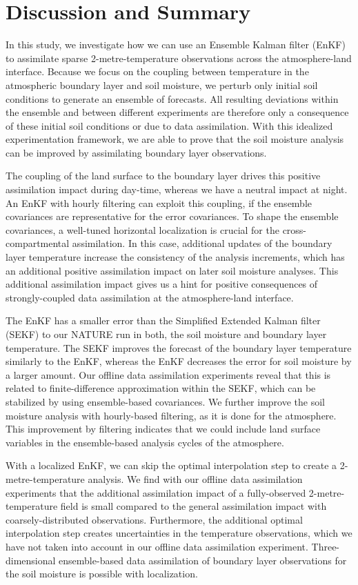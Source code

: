 \documentclass[hess, manuscript]{copernicus}
\begin{document}
\section{Discussion and Summary}

In this study, we investigate how we can use an Ensemble Kalman filter (EnKF) to assimilate sparse 2-metre-temperature observations across the atmosphere-land interface.
Because we focus on the coupling between temperature in the atmospheric boundary layer and soil moisture, we perturb only initial soil conditions to generate an ensemble of forecasts.
All resulting deviations within the ensemble and between different experiments are therefore only a consequence of these initial soil conditions or due to data assimilation.
With this idealized experimentation framework, we are able to prove that
the soil moisture analysis can be improved by assimilating boundary layer observations.

The coupling of the land surface to the boundary layer drives this positive assimilation impact during day-time, whereas we have a neutral impact at night.
An EnKF with hourly filtering can exploit this coupling, if the ensemble covariances are representative for the error covariances.
To shape the ensemble covariances, a well-tuned horizontal localization is crucial for the cross-compartmental assimilation.
In this case, additional updates of the boundary layer temperature increase the consistency of the analysis increments, which has an additional positive assimilation impact on later soil moisture analyses.
This additional assimilation impact gives us a hint for positive consequences of strongly-coupled data assimilation at the atmosphere-land interface.

The EnKF has a smaller error than the Simplified Extended Kalman filter (SEKF) to our NATURE run in both, the soil moisture and boundary layer temperature.
The SEKF improves the forecast of the boundary layer temperature similarly to the EnKF, whereas the EnKF decreases the error for soil moisture by a larger amount.
Our offline data assimilation experiments reveal that this is related to finite-difference approximation within the SEKF, which can be stabilized by using ensemble-based covariances.
We further improve the soil moisture analysis with hourly-based filtering, as it is done for the atmosphere.
This improvement by filtering indicates that we could include land surface variables in the ensemble-based analysis cycles of the atmosphere.

With a localized EnKF, we can skip the optimal interpolation step to create a 2-metre-temperature analysis.
We find with our offline data assimilation experiments that the additional assimilation impact of a fully-observed 2-metre-temperature field is small compared to the general assimilation impact with coarsely-distributed observations.
Furthermore, the additional optimal interpolation step creates uncertainties in the temperature observations, which we have not taken into account in our offline data assimilation experiment.
Three-dimensional ensemble-based data assimilation of boundary layer observations for the soil moisture is possible with localization.
\end{document}
